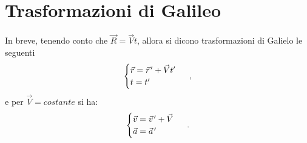\documentclass[12pt, oneside]{book}
\newcommand{\pvec}[1]{\vec{#1}\mkern2mu\vphantom{#1}}
\begin{document}
\section{Trasformazioni di Galileo}
In breve, tenendo conto che $\vec R = \vec V t$, allora si dicono trasformazioni di Galielo le seguenti
\begin{align*}
	\begin{cases}
		\vec r = \pvec r' + \vec V t'\\
		t=t'
	\end{cases}~,
\end{align*}
e per $\vec V = costante$ si ha:
\begin{align*}
	\begin{cases}
		\vec v = \pvec v' + \vec V\\
		\vec a = \pvec a'
	\end{cases}~.
\end{align*}
\end{document}

